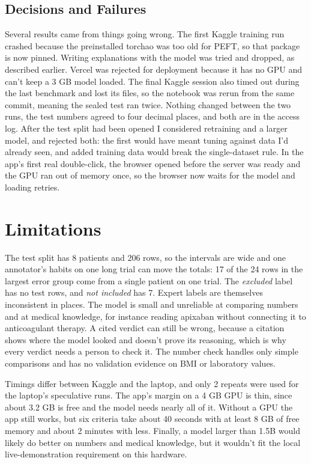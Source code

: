 \documentclass[conference]{IEEEtran}
\begin{document}
\subsection{Decisions and Failures}

Several results came from things going wrong. The first Kaggle training run crashed because the preinstalled torchao was too old for PEFT, so that package is now pinned. Writing explanations with the model was tried and dropped, as described earlier. Vercel was rejected for deployment because it has no GPU and can't keep a 3 GB model loaded. The final Kaggle session also timed out during the last benchmark and lost its files, so the notebook was rerun from the same commit, meaning the sealed test ran twice. Nothing changed between the two runs, the test numbers agreed to four decimal places, and both are in the access log. After the test split had been opened I considered retraining and a larger model, and rejected both: the first would have meant tuning against data I'd already seen, and added training data would break the single-dataset rule. In the app's first real double-click, the browser opened before the server was ready and the GPU ran out of memory once, so the browser now waits for the model and loading retries.

\section{Limitations}

The test split has 8 patients and 206 rows, so the intervals are wide and one annotator's habits on one long trial can move the totals: 17 of the 24 rows in the largest error group come from a single patient on one trial. The \emph{excluded} label has no test rows, and \emph{not included} has 7. Expert labels are themselves inconsistent in places. The model is small and unreliable at comparing numbers and at medical knowledge, for instance reading apixaban without connecting it to anticoagulant therapy. A cited verdict can still be wrong, because a citation shows where the model looked and doesn't prove its reasoning, which is why every verdict needs a person to check it. The number check handles only simple comparisons and has no validation evidence on BMI or laboratory values.

Timings differ between Kaggle and the laptop, and only 2 repeats were used for the laptop's speculative runs. The app's margin on a 4 GB GPU is thin, since about 3.2 GB is free and the model needs nearly all of it. Without a GPU the app still works, but six criteria take about 40 seconds with at least 8 GB of free memory and about 2 minutes with less. Finally, a model larger than 1.5B would likely do better on numbers and medical knowledge, but it wouldn't fit the local live-demonstration requirement on this hardware.
\end{document}
